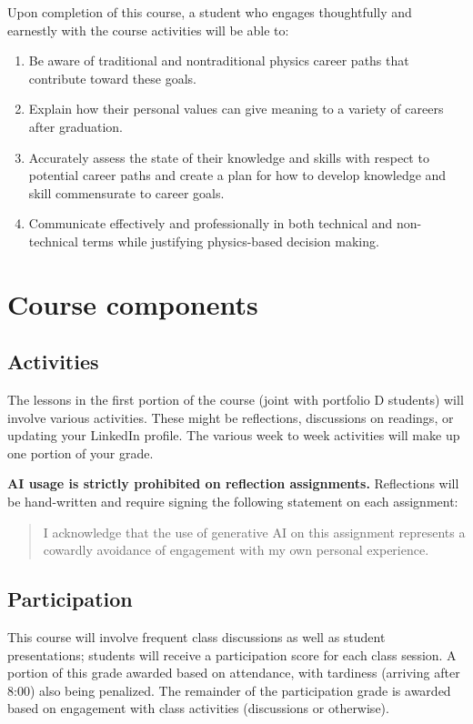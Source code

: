 \documentclass{syllabus}
\begin{document}
Upon completion of this course, a student who engages thoughtfully and earnestly with the course activities will be able to:
\begin{enumerate}[label=\textcolor{CarthageDark}{\bfseries\arabic*.}]
    \item Be aware of traditional and nontraditional physics career paths that contribute toward these goals.
    \item Explain how their personal values can give meaning to a variety of careers after graduation.
    \item Accurately assess the state of their knowledge and skills with respect to potential career paths and create a plan for how to develop knowledge and skill commensurate to career goals.
    \item Communicate effectively and professionally in both technical and non-technical terms while justifying physics-based decision making.
\end{enumerate}



\section*{Course components}

\subsection{Activities}
The lessons in the first portion of the course (joint with portfolio D students) will involve various activities. These might be reflections, discussions on readings, or updating your LinkedIn profile. The various week to week activities will make up one portion of your grade.

\textbf{AI usage is strictly prohibited on reflection assignments.} Reflections will be hand-written and require signing the following statement on each assignment:
\begin{quote}
    I acknowledge that the use of generative AI on this assignment represents a cowardly avoidance of engagement with my own personal experience.
\end{quote}

\subsection*{Participation} This course will involve frequent class discussions as well as student presentations; students will receive a participation score for each class session. A portion of this grade awarded based on attendance, with tardiness (arriving after 8:00) also being penalized. The remainder of the participation grade is awarded based on engagement with class activities (discussions or otherwise).
\end{document}
